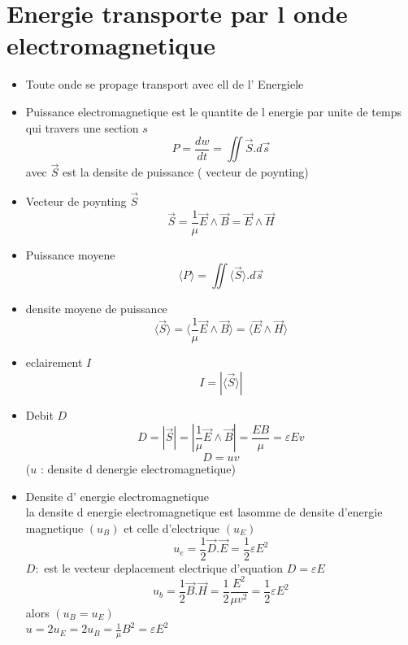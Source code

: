 \documentclass[12pt]{book}
\begin{document}
        \section{Energie transporte par l onde electromagnetique}
            \begin{itemize}
                \item Toute onde se propage transport avec ell de l' Energiele 
                \item Puissance electromagnetique est le quantite de l energie par unite de temps qui travers une section $s$
                    \[ P = \frac{dw}{dt} = \iint \vec{S}.d\vec{s}\] avec $\vec{S}$ est la densite de puissance ( vecteur de poynting)
                \item Vecteur de poynting $\vec{S}$ \[ \vec{S} = \frac{1}{\mu}\vec{E}\wedge\vec{B} = \vec{E}\wedge\vec{H} \]
                \item Puissance moyene \[ \langle P \rangle  =\iint \langle \vec{S}\rangle .d\vec{s}\]
                \item densite moyene de puissance \[ \langle \vec{S} \rangle  = \langle \frac{1}{\mu}\vec{E}\wedge\vec{B} \rangle = \langle \vec{E}\wedge\vec{H} \rangle \]
                \item eclairement $I$ \[ I = | \langle \vec{S} \rangle| \]
                \item Debit $D$ \[ D = |\vec{S}| = |\frac{1}{\mu}\vec{E}\wedge\vec{B}| =\frac{EB}{\mu} = \varepsilon E v\] 
                    \[D =uv\] ($u$ : densite d denergie electromagnetique)
                \item Densite d' energie electromagnetique \\
                    la densite d energie electromagnetique est lasomme de densite d'energie magnetique $(u_B)$ et celle d'electrique $(u_E)$
                    \[ u_e = \frac{1}{2}\vec{D}.\vec{E}=\frac{1}{2}\varepsilon E^2  \]
                    $ D : $ est le vecteur deplacement electrique d'equation $D = \varepsilon E$
                    \[ u_b = \frac{1}{2}\vec{B}.\vec{H}=\frac{1}{2}\frac{E^2}{\mu v^2} = \frac{1}{2}\varepsilon E^2 \]
                    alors $(u_B = u_E)$ \\
                    $u = 2u_E=2u_B=\frac{1}{\mu}B^2 = \varepsilon E^2$\\

            \end{itemize}
\end{document}

